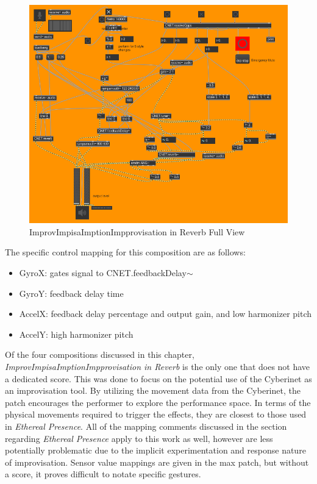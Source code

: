 \begin{figure}
    \centering
    \includegraphics{diagrams/maxPatches/improvRaw.png}
    \caption{ImprovImpisaImptionImpprovisation in Reverb Full View}
    \label{fig:improvFull}
\end{figure}

The specific control mapping for this composition are as follows: 

\begin{itemize}
    \item GyroX: gates signal to CNET.feedbackDelay$\sim$
    \item GyroY: feedback delay time
    \item AccelX: feedback delay percentage and output gain, and low harmonizer pitch
    \item AccelY: high harmonizer pitch
\end{itemize}

Of the four compositions discussed in this chapter, \textit{ImprovImpisaImptionImpprovisation in Reverb} is the only one that does not have a dedicated score. This was done to focus on the potential use of the Cyberinet as an improvisation tool. By utilizing the movement data from the Cyberinet, the patch encourages the performer to explore the performance space. In terms of the physical movements required to trigger the effects, they are closest to those used in \textit{Ethereal Presence}. All of the mapping comments discussed in the section regarding \textit{Ethereal Presence} apply to this work as well, however are less potentially problematic due to the implicit experimentation and response nature of improvisation. Sensor value mappings are given in the max patch, but without a score, it proves difficult to notate specific gestures.

